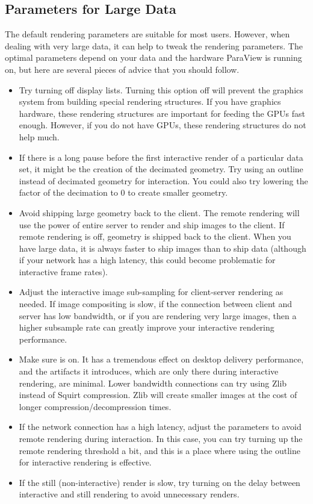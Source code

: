 
\subsection{Parameters for Large Data}

The default rendering parameters are suitable for most users.  However,
when dealing with very large data, it can help to tweak the rendering
parameters.  The optimal parameters depend on your data and the hardware
ParaView is running on, but here are several pieces of advice that you
should follow.

\begin{itemize}
\item Try turning off display lists. Turning this option off will
  prevent the graphics system from building special rendering structures.
  If you have graphics hardware, these rendering structures are important
  for feeding the GPUs fast enough.  However, if you do not have GPUs,
  these rendering structures do not help much.
\item If there is a long pause before the first interactive render of a
  particular data set, it might be the creation of the decimated
  geometry. Try using an outline instead of decimated geometry for
  interaction. You could also try lowering the factor of the decimation to
  0 to create smaller geometry.
\item Avoid shipping large geometry back to the client. The remote
  rendering will use the power of entire server to render and ship images
  to the client.  If remote rendering is off, geometry is shipped back to
  the client.  When you have large data, it is always faster to ship images
  than to ship data (although if your network has a high latency, this
  could become problematic for interactive frame rates).
\item Adjust the interactive image sub-sampling for client-server rendering
  as needed.  If image compositing is slow, if the connection between
  client and server has low bandwidth, or if you are rendering very large
  images, then a higher subsample rate can greatly improve your interactive
  rendering performance.
\item Make sure  is on.  It has a tremendous effect
  on desktop delivery performance, and the artifacts it introduces, which
  are only there during interactive rendering, are minimal.  Lower
  bandwidth connections can try using Zlib instead of Squirt compression.
  Zlib will create smaller images at the cost of longer
  compression/decompression times.
\item If the network connection has a high latency, adjust the parameters
  to avoid remote rendering during interaction. In this case, you can try
  turning up the remote rendering threshold a bit, and this is a place
  where using the outline for interactive rendering is effective.
\item If the still (non-interactive) render is slow, try turning on the
  delay between interactive and still rendering to avoid unnecessary
  renders.
\end{itemize}



